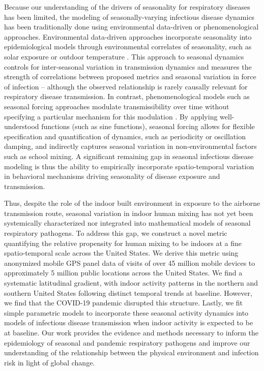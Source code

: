 \documentclass{article}
\begin{document}
Because our understanding of the drivers of seasonality for respiratory diseases has been limited, the modeling of seasonally-varying infectious disease dynamics has been traditionally done using environmental data-driven or phenomenological approaches. Environmental data-driven approaches incorporate seasonality into epidemiological models through environmental correlates of seasonality, such as solar exposure or outdoor temperature \cite{bakker2021exploring, baker2019epidemic, coletti2018shifting}. This  approach to seasonal dynamics controls for inter-seasonal variation in transmission dynamics and measures the strength of correlations between proposed metrics and seasonal variation in force of infection -- although the observed relationship is rarely causally relevant for respiratory disease transmission. In contrast, phenomenological models such as seasonal forcing approaches modulate transmissibility over time without specifying a particular mechanism for this modulation \cite{keeling2001seasonally, altizer2006seasonality}. By applying well-understood functions (such as sine functions), seasonal forcing allows for flexible specification and quantification of dynamics, such as periodicity or oscillation damping, and indirectly captures seasonal variation in non-environmental factors such as school mixing. A significant remaining gap in seasonal infectious disease modeling is thus the ability to empirically incorporate spatio-temporal variation in behavioral mechanisms driving seasonality of disease exposure and transmission.

Thus, despite the role of the indoor built environment in exposure to the airborne transmission route,  seasonal variation in indoor human mixing has not yet been systemically characterized nor integrated into mathematical models of seasonal respiratory pathogens. To address this gap, we construct a novel metric quantifying the relative propensity for human mixing to be indoors at a fine spatio-temporal scale across the United States. We derive this metric using anonymized mobile GPS panel data of visits of over 45 million mobile devices to approximately 5 million public locations across the United States. We find a systematic latitudinal gradient, with indoor activity patterns in the northern and southern United States following distinct temporal trends at baseline. However, we find that the COVID-19 pandemic disrupted this structure. 
Lastly, we fit simple parametric models to incorporate these seasonal activity dynamics into models of infectious disease transmission when indoor activity is expected to be at baseline.
Our work provides the evidence and methods necessary to inform the epidemiology of seasonal and pandemic respiratory pathogens and improve our understanding of the relationship between the physical environment and infection risk in light of global change.
\end{document}
